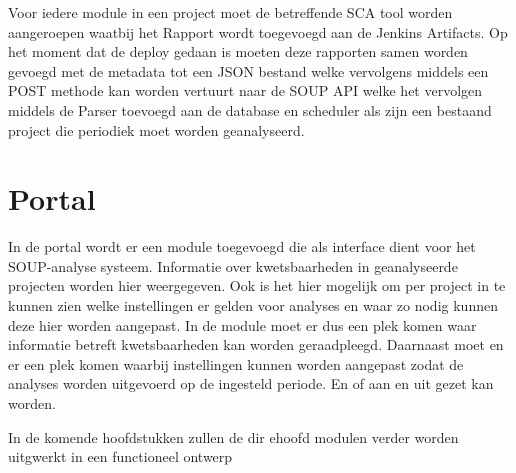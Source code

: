 Voor iedere module in een project moet de betreffende SCA tool worden aangeroepen waatbij het Rapport wordt toegevoegd aan de Jenkins Artifacts.
Op het moment dat de deploy gedaan is moeten deze rapporten samen worden gevoegd met de metadata tot een JSON bestand welke vervolgens middels een POST methode kan worden vertuurt naar de SOUP API welke het vervolgen middels de Parser toevoegd aan de database en scheduler als zijn een bestaand project die periodiek moet worden geanalyseerd.


\section{Portal}\label{sec:portal}
In de portal wordt er een module toegevoegd die als interface dient voor het SOUP-analyse systeem. Informatie over kwetsbaarheden in geanalyseerde projecten worden hier weergegeven. Ook is het hier mogelijk om per project in te kunnen zien welke instellingen er gelden voor analyses en waar zo nodig kunnen deze hier worden aangepast.
In de module moet er dus een plek komen waar informatie betreft kwetsbaarheden kan worden geraadpleegd. Daarnaast moet en er een plek komen waarbij instellingen kunnen worden aangepast zodat de analyses worden uitgevoerd op de ingesteld periode. En of aan en uit gezet kan worden.

In de komende hoofdstukken zullen de dir ehoofd modulen verder worden uitgwerkt in een functioneel ontwerp
